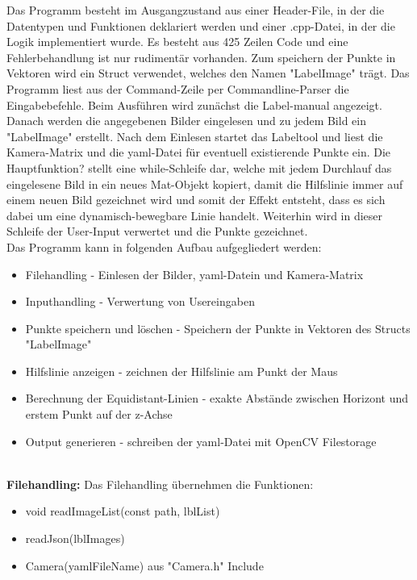 \documentclass[11pt]{scrartcl}
\begin{document}
\noindent
Das Programm besteht im Ausgangzustand aus einer Header-File, in der die Datentypen und Funktionen deklariert werden und einer .cpp-Datei, in der die Logik implementiert wurde. Es besteht aus 425 Zeilen Code und eine Fehlerbehandlung ist nur rudimentär vorhanden. Zum speichern der Punkte in Vektoren wird ein Struct verwendet, welches den Namen "LabelImage" trägt. Das Programm liest aus der Command-Zeile per Commandline-Parser die Eingabebefehle. Beim Ausführen wird zunächst die Label-manual angezeigt. Danach werden die angegebenen Bilder eingelesen und zu jedem Bild ein "LabelImage" erstellt. Nach dem Einlesen startet das Labeltool und liest die Kamera-Matrix und die yaml-Datei für eventuell existierende Punkte ein. Die Hauptfunktion? stellt eine while-Schleife dar, welche mit jedem Durchlauf das eingelesene Bild in ein neues Mat-Objekt kopiert, damit die Hilfslinie immer auf einem neuen Bild gezeichnet wird und somit der Effekt entsteht, dass es sich dabei um eine dynamisch-bewegbare Linie handelt. Weiterhin wird in dieser Schleife der User-Input verwertet und die Punkte gezeichnet.
\\
\noindent
Das Programm kann in folgenden Aufbau aufgegliedert werden:
\begin{itemize}
	\item Filehandling - Einlesen der Bilder, yaml-Datein und Kamera-Matrix
	\item Inputhandling - Verwertung von Usereingaben
	\item Punkte speichern und löschen - Speichern der Punkte in Vektoren des Structs "LabelImage"
	\item Hilfslinie anzeigen - zeichnen der Hilfslinie am Punkt der Maus
	\item Berechnung der Equidistant-Linien - exakte Abstände zwischen Horizont und erstem Punkt auf der z-Achse
	\item Output generieren - schreiben der yaml-Datei mit OpenCV Filestorage
\end{itemize}

\noindent
\\
\textbf{Filehandling:}
\noindent
Das Filehandling übernehmen die Funktionen:
\begin{itemize}
	\item void readImageList(const path,  lblList)
	\item readJson(lblImages)
	\item Camera(yamlFileName) aus "Camera.h" Include
\end{itemize}
\end{document}

